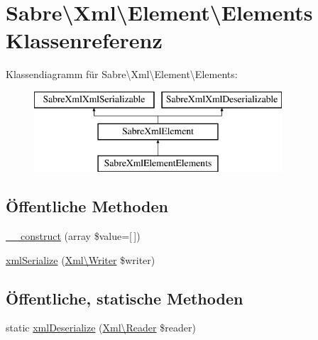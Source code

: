 \hypertarget{class_sabre_1_1_xml_1_1_element_1_1_elements}{}\section{Sabre\textbackslash{}Xml\textbackslash{}Element\textbackslash{}Elements Klassenreferenz}
\label{class_sabre_1_1_xml_1_1_element_1_1_elements}
Klassendiagramm für Sabre\textbackslash{}Xml\textbackslash{}Element\textbackslash{}Elements\+:\begin{figure}[H]
\begin{center}
\leavevmode
\includegraphics[height=3.000000cm]{class_sabre_1_1_xml_1_1_element_1_1_elements}
\end{center}
\end{figure}
\subsection*{Öffentliche Methoden}
\begin{DoxyCompactItemize}
\item 
\mbox{\hyperlink{class_sabre_1_1_xml_1_1_element_1_1_elements_aa0d6612f1e1b7818faf4ef3d794f7558}{\+\_\+\+\_\+construct}} (array \$value=\mbox{[}$\,$\mbox{]})
\item 
\mbox{\hyperlink{class_sabre_1_1_xml_1_1_element_1_1_elements_abbb58205f4f4c3b0a7bed5f79a9bf32a}{xml\+Serialize}} (\mbox{\hyperlink{class_sabre_1_1_xml_1_1_writer}{Xml\textbackslash{}\+Writer}} \$writer)
\end{DoxyCompactItemize}
\subsection*{Öffentliche, statische Methoden}
\begin{DoxyCompactItemize}
\item 
static \mbox{\hyperlink{class_sabre_1_1_xml_1_1_element_1_1_elements_a4e517e8747e5e2e2eda0c5f8dde40f4b}{xml\+Deserialize}} (\mbox{\hyperlink{class_sabre_1_1_xml_1_1_reader}{Xml\textbackslash{}\+Reader}} \$reader)
\end{DoxyCompactItemize}
